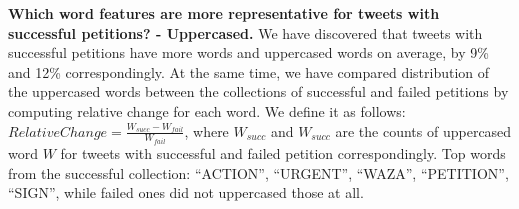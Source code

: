 \textbf{Which word features are more representative for tweets with successful petitions? - Uppercased.} We have discovered that tweets with successful petitions have more words and uppercased words on average, by 9\% and 12\% correspondingly. At the same time, we have compared distribution of the uppercased words between the collections of successful and failed petitions by computing relative change for each word. We define it as follows: $RelativeChange = \frac{W_{succ} - W_{fail}}{W_{fail}}$, where $W_{succ}$ and $W_{succ}$ are the counts of uppercased word $W$ for tweets with successful and failed petition correspondingly. Top words from the successful collection: ``ACTION'', ``URGENT'', ``WAZA'', ``PETITION'', ``SIGN'', while failed ones did not uppercased those at all.